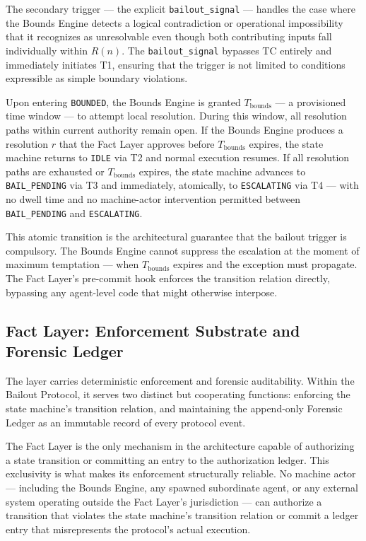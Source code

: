 The secondary trigger --- the explicit \texttt{bailout\_signal} --- handles the case where the Bounds Engine detects a logical contradiction or operational impossibility that it recognizes as unresolvable even though both contributing inputs fall individually within $R(n)$. The \texttt{bailout\_signal} bypasses TC entirely and immediately initiates T1, ensuring that the trigger is not limited to conditions expressible as simple boundary violations.

Upon entering \texttt{BOUNDED}, the Bounds Engine is granted $T_{\text{bounds}}$ --- a provisioned time window --- to attempt local resolution. During this window, all resolution paths within current authority remain open. If the Bounds Engine produces a resolution $r$ that the Fact Layer approves before $T_{\text{bounds}}$ expires, the state machine returns to \texttt{IDLE} via T2 and normal execution resumes. If all resolution paths are exhausted or $T_{\text{bounds}}$ expires, the state machine advances to \texttt{BAIL\_PENDING} via T3 and immediately, atomically, to \texttt{ESCALATING} via T4 --- with no dwell time and no machine-actor intervention permitted between \texttt{BAIL\_PENDING} and \texttt{ESCALATING}.

This atomic transition is the architectural guarantee that the bailout trigger is compulsory. The Bounds Engine cannot suppress the escalation at the moment of maximum temptation --- when $T_{\text{bounds}}$ expires and the exception must propagate. The Fact Layer's pre-commit hook enforces the transition relation directly, bypassing any agent-level code that might otherwise interpose.

\subsection{Fact Layer: Enforcement Substrate and Forensic Ledger}\label{sec:fact-layer}

The \fact{} layer carries deterministic enforcement and forensic auditability. Within the Bailout Protocol, it serves two distinct but cooperating functions: enforcing the state machine's transition relation, and maintaining the append-only Forensic Ledger as an immutable record of every protocol event.

The Fact Layer is the only mechanism in the \bxthree{} architecture capable of authorizing a state transition or committing an entry to the authorization ledger. This exclusivity is what makes its enforcement structurally reliable. No machine actor --- including the Bounds Engine, any spawned subordinate agent, or any external system operating outside the Fact Layer's jurisdiction --- can authorize a transition that violates the state machine's transition relation or commit a ledger entry that misrepresents the protocol's actual execution.


